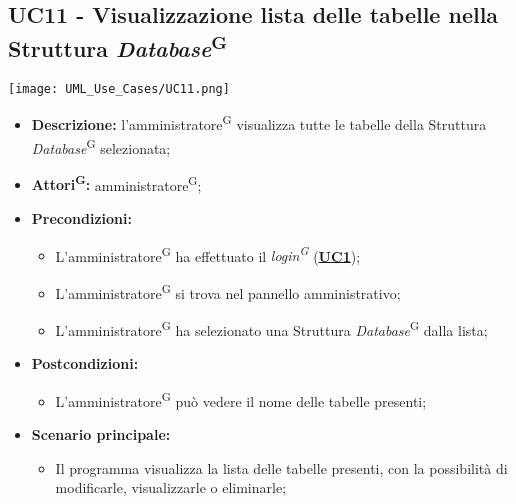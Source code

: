 \subsection{UC11 - Visualizzazione lista delle tabelle nella Struttura \textit{Database}\textsuperscript{G}}
\label{sec:UC11}
\texttt{[image: UML\_Use\_Cases/UC11.png]}
\begin{itemize}
	\item \textbf{Descrizione:} l’amministratore\textsuperscript{G} visualizza tutte le tabelle della Struttura \textit{Database}\textsuperscript{G} selezionata;
	\item \textbf{Attori\textsuperscript{G}:} amministratore\textsuperscript{G};
	\item \textbf{Precondizioni:} 
	\begin{itemize}
		\item L’amministratore\textsuperscript{G} ha effettuato il \textit{login\textsuperscript{G}} (\hyperref[sec:UC1]{\textbf{UC1}});
		\item L’amministratore\textsuperscript{G} si trova nel pannello amministrativo;
		\item L'amministratore\textsuperscript{G} ha selezionato una Struttura \textit{Database}\textsuperscript{G} dalla lista;
	\end{itemize}
	\item \textbf{Postcondizioni:} 
	\begin{itemize}
		\item L'amministratore\textsuperscript{G} può vedere il nome delle tabelle presenti;
	\end{itemize}
	\item \textbf{Scenario principale:} 
	\begin{itemize}
		\item Il programma visualizza la lista delle tabelle presenti, con la possibilità di modificarle, visualizzarle o eliminarle;
	\end{itemize}
\end{itemize}

